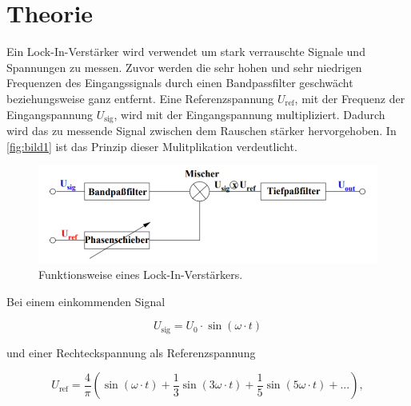 \section{Theorie}
\label{sec:Theorie}




Ein Lock-In-Verstärker wird verwendet um stark verrauschte Signale und Spannungen zu messen.
Zuvor werden die  sehr hohen und sehr niedrigen Frequenzen des Eingangssignals durch einen Bandpassfilter geschwächt beziehungsweise ganz entfernt.
Eine Referenzspannung $U_\text{ref}$, mit der Frequenz der Eingangspannung $U_\text{sig}$, wird mit der Eingangspannung multipliziert.
Dadurch wird das zu messende Signal zwischen dem Rauschen stärker hervorgehoben.
In \autoref{fig:bild1} ist das Prinzip dieser Mulitplikation verdeutlicht.

\begin{figure}
    \centering
    \includegraphics[width=\textwidth/2]{images/bild1.png}
    \caption{Funktionsweise eines Lock-In-Verstärkers.\cite{V303}}
    \label{fig:bild1}
\end{figure}

Bei einem einkommenden Signal 

\begin{equation}
    U_\text{sig} = U_0 \cdot \sin{\left(\omega \cdot t\right)}
    \label{eq:u_sig}
\end{equation}

und einer Rechteckspannung als Referenzspannung

\begin{equation}
    U_\text{ref} = \frac{4}{\pi} \left(\sin{\left(\omega \cdot t\right)} + \frac{1}{3}\sin{\left(3\omega \cdot t\right)} +  \frac{1}{5}\sin{\left(5\omega \cdot t\right)} + ...\right),
    \label{eq:u_ref}
\end{equation}

